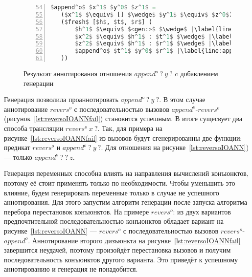 \begin{figure}[h!]
  \begin{center}
  \begin{minipage}{0.49\textwidth}
  \begin{lstlisting}[language=Haskell, frame=single, numbers=left,numberstyle=\small, firstnumber=54, escapechar=|]
 $append^o$ $x^1$ $y^0$ $z^1$ =
   ($x^1$ $\equiv$ [] $\wedge$ $y^1$ $\equiv$ $z^0$) $\vee$ |\label{line:appendoOIOANN2}|
   ($fresh$ [$h$, $t$, $r$] (
       $h^1$ $\equiv$ $<gen:>$ $\wedge$ |\label{line:appendoOIOANN4}|
       $x^2$ $\equiv$ $h^1$ : $t^1$ $\wedge$ |\label{line:appendoOIOANN5}|
       $z^2$ $\equiv$ $h^1$ : $r^1$ $\wedge$ |\label{line:appendoOIOANN6}|
       $append^o$ $t^1$ $y^0$ $r^1$ |\label{line:appendoOIOANN7}|
   ))
    \end{lstlisting}
  \end{minipage}
  \end{center}
  \caption{Результат аннотирования отношения $append^o \ ? \ y \ ?$ c добавлением генерации}
  \label{lst:appendoOIOANN}
\end{figure}

Генерация позволила проаннотировать $append^o \ ? \ y \ ?$.
В этом случае аннотирование $revers^o$ с последовательностью вызовов $append^o$-$revers^o$ (рисунок~\ref{lst:reversoIOANNfail}) становится успешным.
В итоге сущесвует два способа трансляции $revers^o \ x \ ?$.
Так, для примера на рисунке~\ref{lst:reversoIOANNfail} из вызовов будут сгенерированны две функции: предикат $revers^o$ и $append^o \ ? \ y \ ?$.
Для отношения на рисунке~\ref{lst:reversoIOANN}) --- только $append^o \ ? \ ? \ z$.

Генерация переменных способна влиять на направления вычислений конъюнктов, поэтому её стоит применять только по необходимости.
Чтобы уменьшить это влияние, будем генерировать переменные только в случае не успешного аннотирования.
Для этого запустим алгоритм генерации после запуска алгоритма перебора перестановок конъюнктов.
На примере $revers^o$: из двух вариантов предпочтительной последовательностью конъюнктов обладает вариант на рисунке~\ref{lst:reversoIOANN} --- $revers^o$ с последовательностью вызовов $revers^o$-$append^o$.
Аннотирование второго дизъюнкта на рисунке~\ref{lst:reversoIOANNfail} завершится неудачей, поэтому произойдёт перестановка вызовов и получим последовательность конъюнктов другого варианта.
Это приведёт к успешному аннотированию и генерация не понадобится.
